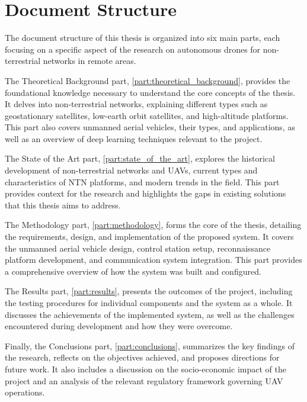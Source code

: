 \chapter{Document Structure}\label{ch:document_structure}

The document structure of this thesis is organized into six main parts, each focusing on a specific aspect of the research on autonomous drones for non-terrestrial networks in remote areas.

The Theoretical Background part, \cref{part:theoretical_background}, provides the foundational knowledge necessary to understand the core concepts of the thesis. It delves into non-terrestrial networks, explaining different types such as geostationary satellites, low-earth orbit satellites, and high-altitude platforms. This part also covers unmanned aerial vehicles, their types, and applications, as well as an overview of deep learning techniques relevant to the project.

The State of the Art part, \cref{part:state_of_the_art}, explores the historical development of non-terrestrial networks and UAVs, current types and characteristics of NTN platforms, and modern trends in the field. This part provides context for the research and highlights the gaps in existing solutions that this thesis aims to address.

The Methodology part, \cref{part:methodology}, forms the core of the thesis, detailing the requirements, design, and implementation of the proposed system. It covers the unmanned aerial vehicle design, control station setup, reconnaissance platform development, and communication system integration. This part provides a comprehensive overview of how the system was built and configured.

The Results part, \cref{part:results}, presents the outcomes of the project, including the testing procedures for individual components and the system as a whole. It discusses the achievements of the implemented system, as well as the challenges encountered during development and how they were overcome.

Finally, the Conclusions part, \cref{part:conclusions}, summarizes the key findings of the research, reflects on the objectives achieved, and proposes directions for future work. It also includes a discussion on the socio-economic impact of the project and an analysis of the relevant regulatory framework governing UAV operations.
